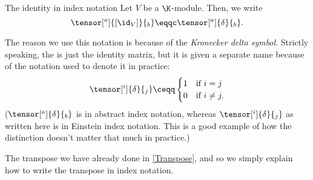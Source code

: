 \begin{ntn}{The identity in index notation}{}
	Let $V$ be a $\K$-module.  Then, we write
	\begin{equation}
	\tensor[^a]{[\id _V]}{_b}\eqqc \tensor[^a]{\delta}{_b}.
	\end{equation}
	\begin{rmk}
		The reason we use this notation is because of the \emph{Kronecker delta symbol}.  Strictly speaking, the  is just the identity matrix, but it is given a separate name because of the notation used to denote it in practice:
		\begin{equation}
		\tensor[^i]{\delta}{_j}\ceqq \begin{cases}1 & \text{if }i=j \\ 0 & \text{if }i\neq j.\end{cases}
		\end{equation}
		($\tensor[^a]{\delta}{_b}$ is in abstract index notation, whereas $\tensor[^i]{\delta}{_j}$ as written here is in Einstein index notation.  This is a good example of how the distinction doesn't matter that much in practice.)
	\end{rmk}
\end{ntn}
The transpose we have already done in \cref{Transpose}, and so we simply explain how to write the transpose in index notation.

